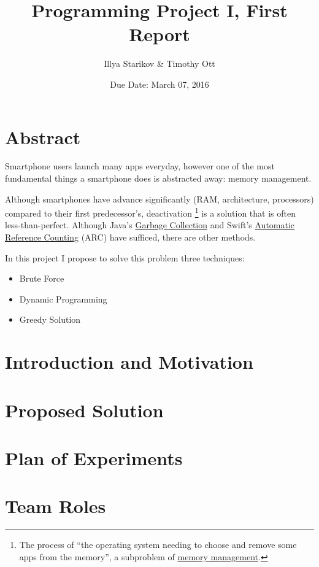 \documentclass{article}
\title{Programming Project I, First Report}
\author{Illya Starikov \& Timothy Ott}
\date{Due Date: March 07, 2016}
\begin{document}
\maketitle

\section{Abstract}
Smartphone users launch many apps everyday, however one of the most fundamental things a smartphone does is abstracted away: memory management.

Although smartphones have advance significantly (RAM, architecture, processors) compared to their first predecessor's, deactivation \footnote{The process of ``the operating system needing to choose and remove some apps from the memory'', a subproblem of \href{https://en.wikipedia.org/wiki/Memory_management}{memory management}.} is a solution that is often less-than-perfect. Although Java's \href{http://www.oracle.com/webfolder/technetwork/tutorials/obe/java/gc01/index.html}{Garbage Collection} and Swift's \href{https://developer.apple.com/library/ios/documentation/Swift/Conceptual/Swift_Programming_Language/AutomaticReferenceCounting.html}{Automatic Reference Counting} (ARC) have sufficed, there are other methods.

In this project I propose to solve this problem three techniques:

\begin{itemize}
    \item Brute Force
    \item Dynamic Programming
    \item Greedy Solution
\end{itemize}

\section{Introduction and Motivation}
\section{Proposed Solution}
\section{Plan of Experiments}
\section{Team Roles}
\end{document}
